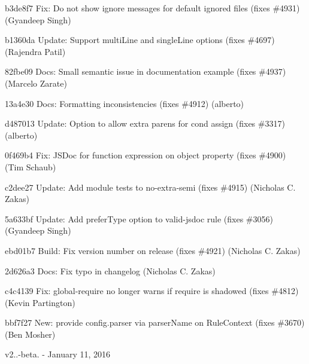 \begin{DoxyItemize}
\item b3de8f7 Fix\+: Do not show ignore messages for default ignored files (fixes \#4931) (Gyandeep Singh)
\item b1360da Update\+: Support multi\+Line and single\+Line options (fixes \#4697) (Rajendra Patil)
\item 82fbe09 Docs\+: Small semantic issue in documentation example (fixes \#4937) (Marcelo Zarate)
\item 13a4e30 Docs\+: Formatting inconsistencies (fixes \#4912) (alberto)
\item d487013 Update\+: Option to allow extra parens for cond assign (fixes \#3317) (alberto)
\item 0f469b4 Fix\+: JSDoc for function expression on object property (fixes \#4900) (Tim Schaub)
\item c2dee27 Update\+: Add module tests to no-\/extra-\/semi (fixes \#4915) (Nicholas C. Zakas)
\item 5a633bf Update\+: Add {\ttfamily prefer\+Type} option to {\ttfamily valid-\/jsdoc} rule (fixes \#3056) (Gyandeep Singh)
\item ebd01b7 Build\+: Fix version number on release (fixes \#4921) (Nicholas C. Zakas)
\item 2d626a3 Docs\+: Fix typo in changelog (Nicholas C. Zakas)
\item c4c4139 Fix\+: global-\/require no longer warns if require is shadowed (fixes \#4812) (Kevin Partington)
\item bbf7f27 New\+: provide config.\+parser via {\ttfamily parser\+Name} on Rule\+Context (fixes \#3670) (Ben Mosher)
\end{DoxyItemize}

v2..-\/beta. -\/ January 11, 2016


